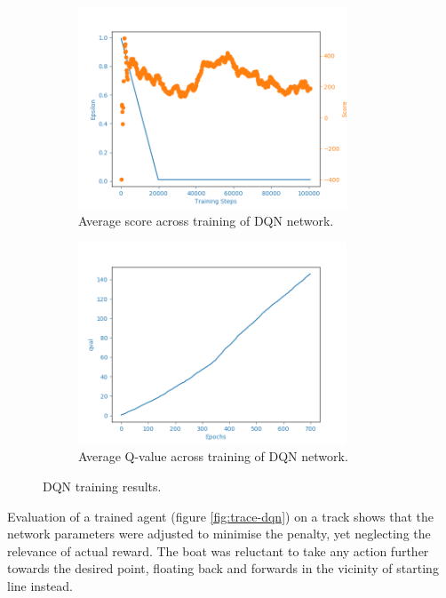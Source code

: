 \begin{figure}[h]
\begin{subfigure}{.48\textwidth}
     \centering
    \includegraphics[width=8cm]{img/DQNAgent_WamvNavTwoSetsBuoys-v0_normal_1127_1016.png}
    \caption{Average score across training of DQN network.}
    \label{fig:avg-score-dqn}   
\end{subfigure}
\begin{subfigure}{.48\textwidth}
    \centering
    \includegraphics[width=8cm]{img/DQNAgent_WamvNavTwoSetsBuoys-v0_normal_1129_1802_qval.png}
    \caption{Average Q-value across training of DQN network.}
    \label{fig:avg-qval-dqn}
\end{subfigure}
\caption{DQN training results.}
\label{fig:dqn-results}
\end{figure}

Evaluation of a trained agent (figure \ref{fig:trace-dqn}) on a track shows that the network parameters were adjusted to minimise the penalty, yet neglecting the relevance of actual reward. The boat was reluctant to take any action further towards the desired point, floating back and forwards in the vicinity of starting line instead.

